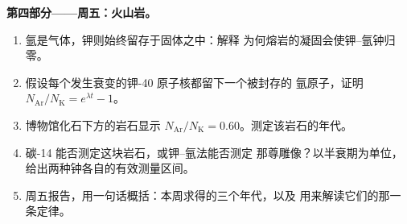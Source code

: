 \begin{problem}
\medskip
\noindent\textbf{第四部分——周五：火山岩。}
\begin{enumerate}[resume]
  \item 氩是气体，钾则始终留存于固体之中：解释
        为何熔岩的凝固会使钾–氩钟归零。
  \item 假设每个发生衰变的钾-40 原子核都留下一个被封存的
        氩原子，证明
        $N_{\mathrm{Ar}}/N_{\mathrm K} = e^{\lambda t} - 1$。
  \item 博物馆化石下方的岩石显示
        $N_{\mathrm{Ar}}/N_{\mathrm K} = 0.60$。测定该岩石的年代。
  \item 碳-14 能否测定这块岩石，或钾–氩法能否测定
        那尊雕像？以半衰期为单位，给出两种钟各自的有效测量区间。
  \item 周五报告，用一句话概括：本周求得的三个年代，以及
        用来解读它们的那一条定律。
\end{enumerate}
\end{problem}
